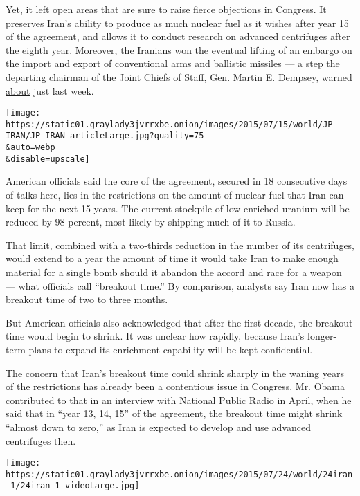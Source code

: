 Yet, it left open areas that are sure to raise fierce objections in
Congress. It preserves Iran's ability to produce as much nuclear fuel as
it wishes after year 15 of the agreement, and allows it to conduct
research on advanced centrifuges after the eighth year. Moreover, the
Iranians won the eventual lifting of an embargo on the import and export
of conventional arms and ballistic missiles --- a step the departing
chairman of the Joint Chiefs of Staff, Gen. Martin E. Dempsey,
\href{http://www.nytimes3xbfgragh.onion/2015/07/11/world/middleeast/un-arms-ban-on-iran-remains-a-hurdle-to-nuclear-deal.html}{warned
about} just last week.

\texttt{[image: https://static01.graylady3jvrrxbe.onion/images/2015/07/15/world/JP-IRAN/JP-IRAN-articleLarge.jpg?quality=75\\\&auto=webp\\\&disable=upscale]}

American officials said the core of the agreement, secured in 18
consecutive days of talks here, lies in the restrictions on the amount
of nuclear fuel that Iran can keep for the next 15 years. The current
stockpile of low enriched uranium will be reduced by 98 percent, most
likely by shipping much of it to Russia.

That limit, combined with a two-thirds reduction in the number of its
centrifuges, would extend to a year the amount of time it would take
Iran to make enough material for a single bomb should it abandon the
accord and race for a weapon --- what officials call ``breakout time.''
By comparison, analysts say Iran now has a breakout time of two to three
months.

But American officials also acknowledged that after the first decade,
the breakout time would begin to shrink. It was unclear how rapidly,
because Iran's longer-term plans to expand its enrichment capability
will be kept confidential.

The concern that Iran's breakout time could shrink sharply in the waning
years of the restrictions has already been a contentious issue in
Congress. Mr. Obama contributed to that in an interview with National
Public Radio in April, when he said that in ``year 13, 14, 15'' of the
agreement, the breakout time might shrink ``almost down to zero,'' as
Iran is expected to develop and use advanced centrifuges then.

\href{https://www.nytimes3xbfgragh.onion/interactive/2015/07/14/world/middleeast/iran-nuclear-deal-who-got-what-they-wanted.html}{}

\texttt{[image: https://static01.graylady3jvrrxbe.onion/images/2015/07/24/world/24iran-1/24iran-1-videoLarge.jpg]}


